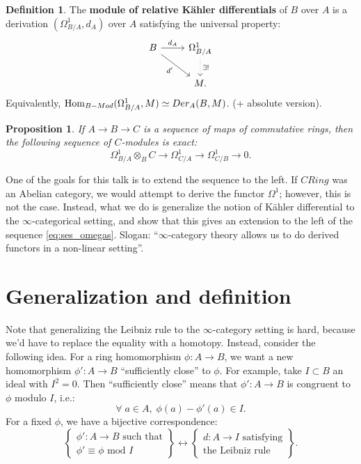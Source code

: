 \documentclass[10pt,a4paper,reqno,oneside]{book} %
\theoremstyle{plain}
\newtheorem{prop}[thm]{Proposition}
\theoremstyle{definition}
\newtheorem{defin}[thm]{Definition}
\theoremstyle{remark}
\numberwithin{equation}{section}
\begin{document}
\begin{defin}
The \textbf{module of relative K\"ahler differentials} of $B$ over $A$ is a derivation $(\Omega^{1}_{B/A}, d_A)$ 
over $A$ satisfying the universal property:
\[
\begin{tikzcd}
B \arrow{r}{d_A}\arrow[swap]{rd}{d'} & \Omega^1_{B/A}\arrow[dotted]{d}{\exists !} \\
 & M.
\end{tikzcd}
\]
Equivalently, $\operatorname{Hom}_{B-Mod}(\Omega^1_{B/A}, M) \simeq Der_A(B,M)$. (+ absolute version).
\end{defin}

\begin{prop}
If $A \to B \to C$ is a sequence of maps of commutative rings, then the following sequence of $C$-modules is exact:
\begin{equation}
\label{eq:ses_omegas}
	\Omega^1_{B/A} \otimes_B C \to \Omega^1_{C/A} \to \Omega^1_{C/B} \to 0.
\end{equation}
\end{prop}

One of the goals for this talk is to extend the sequence to the left. If $CRing$ was an Abelian category, we would
attempt to derive the functor $\Omega^1$; however, this is not the case. Instead, what we do is generalize the notion of
K\"ahler differential to the $\infty$-categorical setting, and show that this gives an extension to the left of the sequence
\ref{eq:ses_omegas}. Slogan: ``$\infty$-category theory allows us to do derived functors in a non-linear setting''. 



\section{Generalization and definition}
\label{sect:cc_def}

Note that generalizing the Leibniz rule to the $\infty$-category setting is hard, because we'd have to replace the 
equality with a homotopy.
Instead, consider the following idea. For a ring homomorphism $\phi : A \to B$, we want a new homomorphism $\phi': A \to B$ 
``sufficiently close'' to $\phi$. For example, take $I \subset B$ an ideal
with $I^2 = 0$. Then ``sufficiently close'' means that $\phi' : A \to B$ is congruent to $\phi$ modulo $I$, i.e.:
\[	\forall\; a \in A,\; \phi(a) - \phi'(a) \in I.	\]
For a fixed $\phi$, we have a bijective correspondence:
\begin{equation}
\label{eq:corresp_derivations}
\left\{ \begin{array} {c} \phi': A \to B \text{ such that} \\ \phi' \equiv \phi \text{ mod } I \end{array} \right\}
\longleftrightarrow
\left\{ \begin{array} {c} d: A \to I \text{ satisfying} \\ \text{the Leibniz rule} \end{array} \right\} .
\end{equation}
\end{document}
